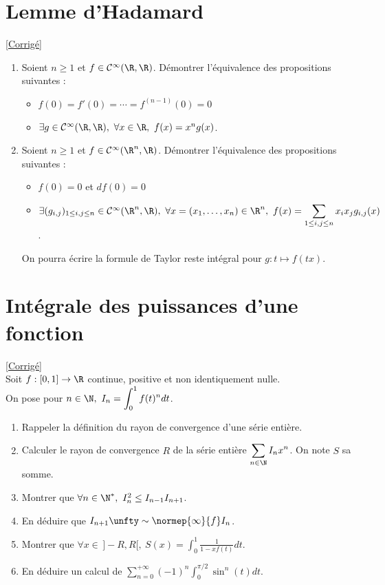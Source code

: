 \documentclass{book}
\begin{document}
\section{Lemme d'Hadamard }
\textcolor{blue}{\hyperref[Lemme d'Hadamard corrigé]{[Corrigé]}}\\
\label{Lemme d'Hadamard}
\begin{enumerate}
	\item Soient $n\geq 1$ et $f\in \mathcal C^\infty(\R,\R)$. Démontrer l'équivalence des propositions suivantes :
	\begin{itemize}
		\item $f(0)=f'(0)=\cdots=f^{(n-1)}(0)=0$
		\item $\exists g\in \mathcal C^\infty(\R,\R),\ \forall x\in \R,\ f(x)=x^ng(x)$.
	\end{itemize}
	\item Soient $n\geq 1$ et $f\in \mathcal C^\infty(\R^n,\R)$. Démontrer l'équivalence des propositions suivantes :
	\begin{itemize}
		\item $f(0)=0$ et $df(0)=0$
		\item $\exists (g_{i,j})_{1\leq i,j\leq n}\in \mathcal C^\infty(\R^n,\R),\ \forall x=(x_1,\dots,x_n)\in \R^n,\ f(x)=\displaystyle\sum_{1\leq i,j\leq n}x_ix_jg_{i,j}(x)$.
	\end{itemize}
	On pourra écrire la formule de Taylor reste intégral pour $g:t\mapsto f(tx)$.
\end{enumerate}

\section{Intégrale des puissances d'une fonction }
\textcolor{blue}{\hyperref[Intégrale des puissances d'une fonction corrigé]{[Corrigé]}}\\
\label{Intégrale des puissances d'une fonction}
Soit $f:[0,1]\to \R$ continue, positive et non identiquement nulle.\\
On pose pour $n\in \N,\ I_n=\displaystyle\int_0^1f(t)^ndt$.
\begin{enumerate}
	\item Rappeler la définition du rayon de convergence d'une série entière.
	\item Calculer le rayon de convergence $R$ de la série entière $\displaystyle\sum_{n\in \N}I_nx^n$. On note $S$ sa somme.
	\item Montrer que $\forall n\in \N^*,\ I_n^2\leq I_{n-1}I_{n+1}$.
	\item En déduire que $I_{n+1}\unfty\sim \normep{\infty}{f}I_n$.
	\item Montrer que $\forall x\in\, ]-R,R[,\ S(x)=\displaystyle\int_0^1\frac{1}{1-xf(t)}dt$.
	\item En déduire un calcul de $\displaystyle\sum_{n=0}^{+\infty}(-1)^n\int_0^{\pi/2}\sin^n(t)dt$.
\end{enumerate}
\end{document}
